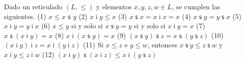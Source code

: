   \begin{lemma}
    \PN Dado un reticulado \((L,\leq )\) y elementos \(x,y,z,w\in L\), se cumplen las siguientes.
    (1) \(x\leq x\) \(\mathsf{s}\) \(y\)
    (2) \(x\;\mathsf{i\;}y\leq x\)
    (3) \(x\;\mathsf{s}\;x=x\mathsf{\;i\;}x=x\)
    (4) \(x\;\mathsf{s}\;y=y\;\mathsf{s}\;x\)
    (5) \(x\mathsf{\;i\;}y=y\mathsf{\;i\;}x\)
    (6) \(x\leq y\) si y solo si \(x\;\mathsf{s}\;y=y\) si y solo si \(x \mathsf{\;i\;}y=x\)
    (7) \(x\;\mathsf{s}\;(x\mathsf{\;i\;}y)=x\)
    (8) \(x\mathsf{\;i\;}(x\;\mathsf{s}\;y)=x\)
    (9) \((x\;\mathsf{s}\;y)\;\mathsf{s}\;z=x\;\mathsf{s}\;(y\;\mathsf{s} \;z)\)
    (10) \((x\mathsf{\;i\;}y)\mathsf{\;i\;}z=x\mathsf{\;i\;}(y\mathsf{\;i\; }z)\)
    (11) Si \(x\leq z\) e \(y\leq w\), entonces \(x\;\mathsf{s}\ y\leq z\; \mathsf{s}\ w\) y \(x\mathsf{\;i\;}y\leq z\mathsf{\;i\;}w\)
    (12) \((x\mathsf{\;i\;}y)\;\mathsf{s}\;(x\mathsf{\;i\;}z)\leq x\mathsf{ \;i\;}(y\;\mathsf{s}\;z)\)
  \end{lemma}
